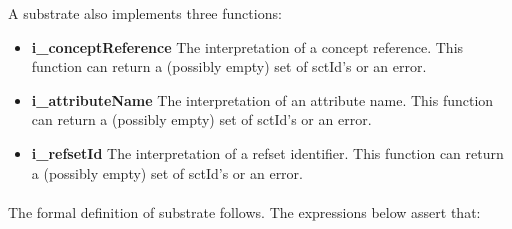 \documentclass{article}
\begin{document}
A substrate also implements three functions:
\begin{itemize}[noitemsep,nolistsep]
\item{\textbf{i\_conceptReference}} The interpretation of a concept reference.  This function can return a (possibly empty) set of sctId's or an error.
\item{\textbf{i\_attributeName}} The interpretation of an attribute name.  This function can return a (possibly empty) set of sctId's or an error.
\item{\textbf{i\_refsetId}} The interpretation of a refset identifier.  This function can return a (possibly empty) set of sctId's or an error.
\end{itemize}
\paragraph{}
The formal definition of substrate follows. The expressions below assert that:
\end{document}

